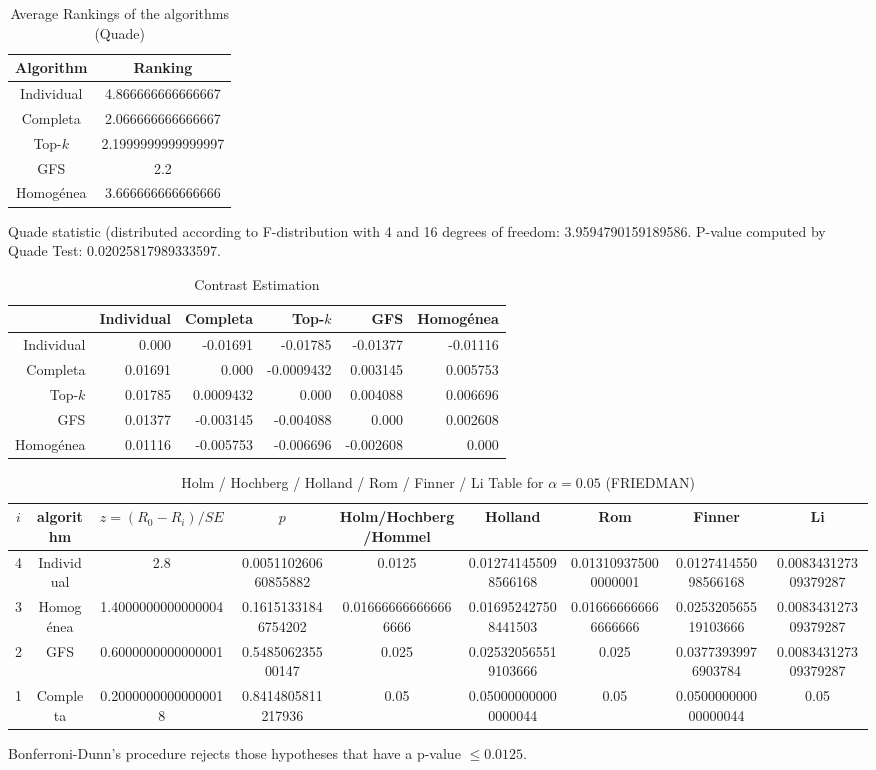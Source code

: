 \documentclass[a4paper,10pt]{article}
\begin{document}
\begin{landscape}
\newpage

\begin{table}[!htp]
\centering
\caption{Average Rankings of the algorithms (Quade)
}\begin{tabular}{c|c}
Algorithm&Ranking\\
\hline
Individual&4.866666666666667\\
Completa&2.066666666666667\\
Top-$k$&2.1999999999999997\\
GFS&2.2\\
Homogénea&3.666666666666666\\
\end{tabular}
\end{table}
Quade statistic (distributed according to F-distribution with 4 and 16 degrees of freedom: 3.9594790159189586. 
P-value computed by Quade Test: 0.02025817989333597.\newline


\newpage

\begin{table}[!htp]
\centering\tiny
\caption{Contrast Estimation}
\begin{tabular}{
|r|r|r|r|r|r|}
\hline
 &Individual&Completa&Top-$k$&GFS&Homogénea\\
\hline
Individual&0.000&-0.01691&-0.01785&-0.01377&-0.01116\\
\hline
Completa&0.01691&0.000&-0.0009432&0.003145&0.005753\\
\hline
Top-$k$&0.01785&0.0009432&0.000&0.004088&0.006696\\
\hline
GFS&0.01377&-0.003145&-0.004088&0.000&0.002608\\
\hline
Homogénea&0.01116&-0.005753&-0.006696&-0.002608&0.000\\
\hline

\end{tabular}
\end{table}

\newpage

\begin{table}[!htp]
\centering\scriptsize
\caption{Holm / Hochberg / Holland / Rom / Finner / Li Table for $\alpha=0.05$ (FRIEDMAN)}
\begin{tabular}{ccccccccc}
$i$&algorithm&$z=(R_0 - R_i)/SE$&$p$&Holm/Hochberg/Hommel&Holland&Rom&Finner&Li\\
\hline
4&Individual&2.8&0.005110260660855882&0.0125&0.012741455098566168&0.013109375000000001&0.012741455098566168&0.008343127309379287\\
3&Homogénea&1.4000000000000004&0.16151331846754202&0.016666666666666666&0.016952427508441503&0.016666666666666666&0.025320565519103666&0.008343127309379287\\
2&GFS&0.6000000000000001&0.548506235500147&0.025&0.025320565519103666&0.025&0.03773939976903784&0.008343127309379287\\
1&Completa&0.20000000000000018&0.8414805811217936&0.05&0.050000000000000044&0.05&0.050000000000000044&0.05\\
\hline
\end{tabular}
\end{table}
Bonferroni-Dunn's procedure rejects those hypotheses that have a p-value $\le0.0125$.



\end{landscape}
\end{document}
